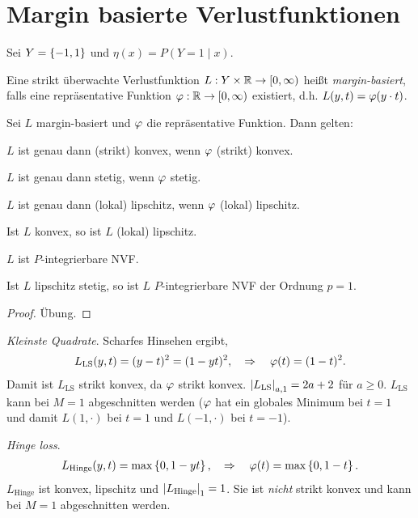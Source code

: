 \section{Margin basierte Verlustfunktionen}

Sei $Y=\left\{ -1,1 \right\}$ und $\eta(x) = P(Y=1\mid x)$.

\begin{defn}
\label{defn:2.2.1}
Eine strikt überwachte Verlustfunktion $L: Y\times \mathbb{R} \to [0,\infty)$ heißt
\emph{margin-basiert}, falls eine repräsentative Funktion $\varphi: \mathbb{R}\to[0,\infty)$
existiert, d.h. $L(y,t) = \varphi(y\cdot t)$.\fishhere
\end{defn}

\begin{lem}
\label{lem:2.2.2}
Sei $L$ margin-basiert und $\varphi$ die repräsentative Funktion. Dann gelten:
\begin{propenum}
\item $L$ ist genau dann (strikt) konvex, wenn $\varphi$ (strikt) konvex.
\item $L$ ist genau dann stetig, wenn $\varphi$ stetig.
\item $L$ ist genau dann (lokal) lipschitz, wenn $\varphi$ (lokal) lipschitz.
\item Ist $L$ konvex, so ist $L$ (lokal) lipschitz.
\item $L$ ist $P$-integrierbare NVF.
\item Ist $L$ lipschitz stetig, so ist $L$ $P$-integrierbare NVF der Ordnung
$p=1$.\fishhere
\end{propenum}
\end{lem}
\begin{proof}
Übung.\qedhere
\end{proof}

\begin{bsp}
\label{bsp:2.2.3}
\newcommand{\LS}{\mathrm{LS}}
\textit{Kleinste Quadrate}. Scharfes Hinsehen ergibt,
\begin{align*}
L_\LS(y,t) = (y-t)^2 = (1-yt)^2, \quad\Rightarrow\quad \ph(t) = (1-t)^2.
\end{align*}
Damit ist $L_\LS$ strikt konvex, da $\varphi$ strikt
konvex. $\abs{L_\LS}_{a,1} = 2a+2$ für $a\ge 0$. $L_\LS$ kann bei $M=1$
abgeschnitten werden ($\varphi$ hat ein globales Minimum bei $t=1$ und damit
$L(1,\cdot)$ bei $t=1$ und $L(-1,\cdot)$ bei $t=-1$).\bsphere
\end{bsp}

\begin{bsp}
\label{bsp:2.2.4}
\newcommand{\Hinge}{\mathrm{Hinge}}
\textit{Hinge loss}.
\begin{align*}
L_\Hinge(y,t) = \max\setd{0,1-yt},\quad \Rightarrow\quad \ph(t) =
\max\setd{0,1-t}.
\end{align*}
$L_\Hinge$ ist konvex, lipschitz und $\abs{L_\Hinge}_1 = 1$. Sie ist
\textit{nicht} strikt konvex und kann bei $M=1$ abgeschnitten werden.\bsphere
\end{bsp}


